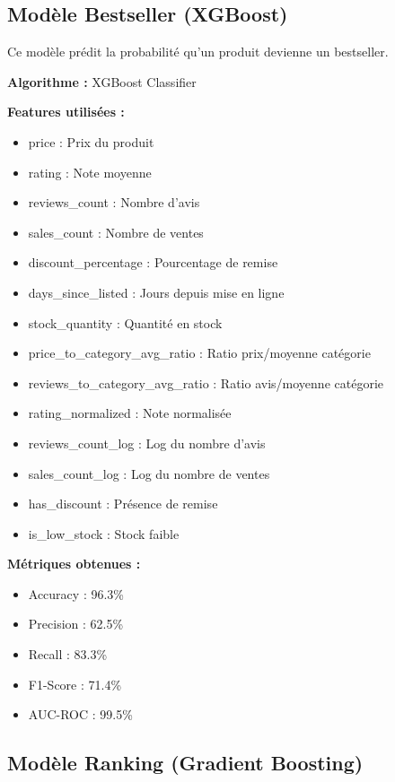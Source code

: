 \documentclass[12pt,a4paper]{report}
\begin{document}
\subsection{Modèle Bestseller (XGBoost)}

Ce modèle prédit la probabilité qu'un produit devienne un bestseller.

\textbf{Algorithme :} XGBoost Classifier

\textbf{Features utilisées :}
\begin{itemize}[noitemsep]
    \item price : Prix du produit
    \item rating : Note moyenne
    \item reviews\_count : Nombre d'avis
    \item sales\_count : Nombre de ventes
    \item discount\_percentage : Pourcentage de remise
    \item days\_since\_listed : Jours depuis mise en ligne
    \item stock\_quantity : Quantité en stock
    \item price\_to\_category\_avg\_ratio : Ratio prix/moyenne catégorie
    \item reviews\_to\_category\_avg\_ratio : Ratio avis/moyenne catégorie
    \item rating\_normalized : Note normalisée
    \item reviews\_count\_log : Log du nombre d'avis
    \item sales\_count\_log : Log du nombre de ventes
    \item has\_discount : Présence de remise
    \item is\_low\_stock : Stock faible
\end{itemize}

\textbf{Métriques obtenues :}
\begin{itemize}[noitemsep]
    \item Accuracy : 96.3\%
    \item Precision : 62.5\%
    \item Recall : 83.3\%
    \item F1-Score : 71.4\%
    \item AUC-ROC : 99.5\%
\end{itemize}

\subsection{Modèle Ranking (Gradient Boosting)}
\end{document}
